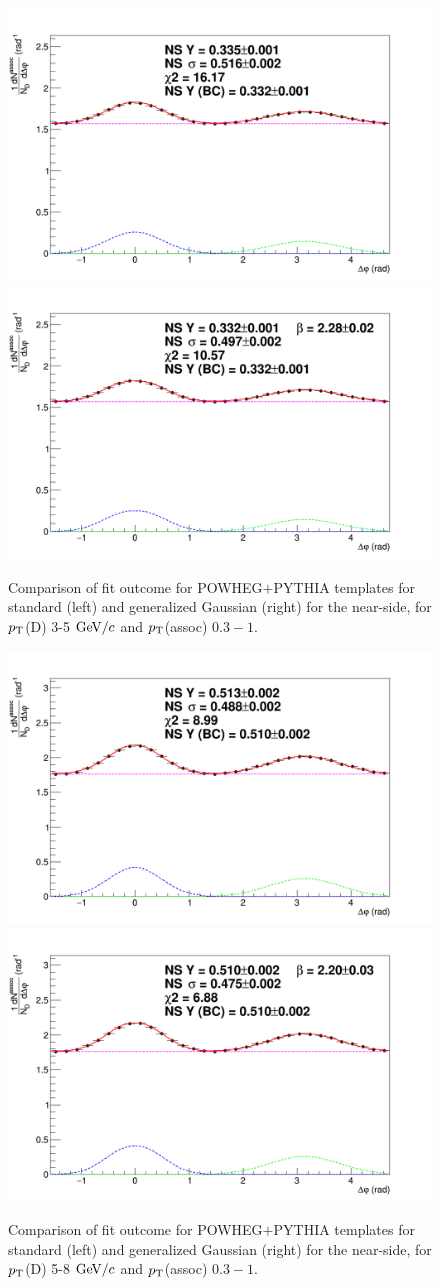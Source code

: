 \begin{figure}[h]
\centering
\includegraphics[width=0.48\linewidth]{figures/Fits/FitOfTemplate_CorrelationPlotsPOWHEG_3To5_03to1_Func2.png}
\includegraphics[width=0.48\linewidth]{figures/Fits/FitOfTemplate_CorrelationPlotsPOWHEG_3To5_03to1_Func7.png}
\caption{Comparison of fit outcome for POWHEG$+$PYTHIA templates for standard (left) and generalized Gaussian (right) for the near-side, for $p_{\rm T}$(D) 3-5 $\mathrm{GeV}/c$ and $p_{\rm T}$(assoc) $0.3-1$.}
\label{fig:TemplateFits1}
\end{figure}
\begin{figure}[h]
\centering
\includegraphics[width=0.48\linewidth]{figures/Fits/FitOfTemplate_CorrelationPlotsPOWHEG_5To8_03to1_Func2.png}
\includegraphics[width=0.48\linewidth]{figures/Fits/FitOfTemplate_CorrelationPlotsPOWHEG_5To8_03to1_Func7.png}
\caption{Comparison of fit outcome for POWHEG$+$PYTHIA templates for standard (left) and generalized Gaussian (right) for the near-side, for $p_{\rm T}$(D) 5-8 $\mathrm{GeV}/c$ and $p_{\rm T}$(assoc) $0.3-1$.}
\label{fig:TemplateFits2}
\end{figure}

